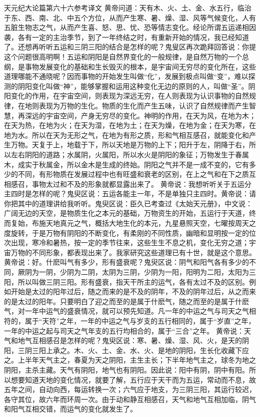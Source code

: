 \documentclass[a4paper,12pt,UTF8,twoside]{ctexbook}
\begin{document}
天元纪大论篇第六十六参考译文
黄帝问道：天有木、火、土、金、水五行，临治于东、西、南、北、中五个方位，从而产生寒、暑、燥、湿、风等气候变化，人有五脏生物志之气，从而产生喜、怒、思、忧、恐等情志变化。经论所谓五运递相因袭，各有一定的主治季节，到了一年终结之时，有重新开始的情况，我已经知道了。还想再听听五运和三阴三阳的结合是怎样的呢？鬼叟区再次跪拜回答说：你提这个问题很高明啊！五运和阴阳是自然界变化的一般规律，是自然万物的一个总纲，是事物发展变化的基础和生长毁灭的根本，是宇宙间无穷尽的变化所在，这些道理哪能不通晓呢？因而事物的开始发生叫做“化”，发展到极点叫做“变”，难以探测的阴阳变化叫做“神”，能够掌握和运用这种变化无边的原则的人，叫做“圣”。阴阳变化的作用，在宇宙空间，则表现为深远无穷，在人则表现为认识事物的自然规律，在地则表现为万物的生化。物质的生化而产生五味，认识了自然规律而产生智慧，再深远的宇宙空间，产身无穷尽的变化。神明的作用，在天为风，在地为木；在天为热，在地为火；在天为湿，在地为土；在天为燥，在地为金；在天为寒，在地为水。所以在天为无形之气，在地为有形之质，形和气相互感召，就能变化和产生万物。天复于上，地载于下，所以天地是万物的上下；阳升于左，阴降于右，所以左右阴阳的道路；水属阴，火属阳，所以水火是阴阳的象征；万物发生于春属木，成实于秋属金，所以金木是生成的终始。阴阳之气并不是一成不变的，它有多少的不同，有形物质在发展过程中也有旺盛和衰老的区别，在上之气和在下之质互相感召，事物太过和不及的形象就都显露出来了。
黄帝说：我想听听关于五运分主四时是怎样的呢？鬼臾区说：五运各能主一年，不是单独只主四时。黄帝说：请你把其中的道理讲给我听听。鬼臾区说：臣久已考查过《太始天元册》，中文说：广阔无边的天空，是物质生化之本元的基础，万物资生的开始，五运行于天道，终而复始，布施天地真元之气，概括大地生化的本元，九星悬照天空，七曜按周天之度旋转，于是万物有阴阳的不断变化，有柔刚的不同性质，幽暗和显明按一定的位次出现，寒冷和暑热，按一定的季节往来，这些生生不息之机，变化无穷之道；宇宙万物的不同形象，都表现出来了。我家研究这些道理已有十世，就是这个意思。
黄帝说：好。什麽叫气有多少，形有盛衰呢？鬼臾区说：阴气和阳气各有多少的不同，厥阴为一阴，少阴为二阴，太阴为三阴，少阴为一阳，阳明为二阳，太阳为三阳，所以叫做三阴三阳。形有盛衰，指天干所主的运气，各有太过不及的区别。例如开始是太过的阳年过后，随之而来的是不及的阴年，不及的阴年过后，从之而来的是太过的阳年。只要明白了迎之而至的是属于什麽气，随之而至的是属于什麽气，对一年中运气的盛衰情况，就可以预先知道。凡一年的中运之气与司天之气相符的，属于“天符”之年，一年的中运之气与岁支的五行相同的，属于“岁直”之年，一年的中运之起与司天之气年支的五行均相合的，属于“三合”之年。
黄帝说：天气和地气互相感召是怎样的呢？鬼臾区说：寒、暑、燥、湿、风、火，是天的阴阳，三阴三阳上承之。木、火、土、金、水、火、是地的阴阳，生长化收藏下应之。上半年天气主之，春夏为天之阴阳，主生主长；下半年地气主之，球冬为地之阴阳，主杀主藏。天气有阴阳，地气也有阴阳。因此说：阳中有阴，阴中有阳。所以想要知道天地的变化情况，就要了解，五行应于天干而为五运，常动而不息，故五年之间，自动向西，每运转换一次；六气应于地支，为三阴三阳，其运行较迟，各守其位，故六年而环周一次。由于动和静互相感召，天气和地气互相加临，阴气和阳气互相交错，而运气的变化就发生了。
\end{document}
